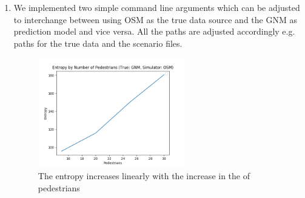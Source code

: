 \documentclass[10pt,a4paper]{article}
\begin{document}
\begin{enumerate}
	\item We implemented two simple command line arguments which can be adjusted to interchange between using OSM as the true data source and the GNM as prediction model and vice versa. All the paths are adjusted accordingly e.g. paths for the true data and the scenario files.
	\begin{figure}[H]
    \centering
    \includegraphics[width=0.6\textwidth]{pictures/task5/gnm_osm.png}
    \caption{The entropy increases linearly with the increase in the of 			pedestrians}
    \label{fig:gnm_osm}
	\end{figure}
\end{enumerate}
\end{document}
